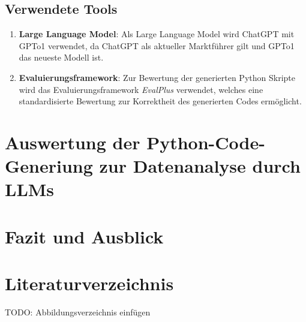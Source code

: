 \documentclass[11pt,a4paper]{article}
\begin{document}
\subsection{Verwendete Tools}
    \begin{enumerate}
        \item \textbf{Large Language Model}: Als Large Language Model wird ChatGPT mit GPTo1 verwendet, da ChatGPT als aktueller Marktführer gilt und GPTo1 das neueste Modell ist.
        \item \textbf{Evaluierungsframework}: Zur Bewertung der generierten Python Skripte wird das Evaluierungsframework \emph{EvalPlus}\cite{evalplus} verwendet, welches eine standardisierte Bewertung zur Korrektheit des generierten Codes ermöglicht.
    \end{enumerate}

\section{Auswertung der Python-Code-Generiung zur Datenanalyse durch LLMs}
\label{sec:auswertung}

\section{Fazit und Ausblick}
\label{sec:fazit}

\newpage
\section{Literaturverzeichnis}
\label{sec:anhang}
\printbibliography
TODO: Abbildungsverzeichnis einfügen
\end{document}
